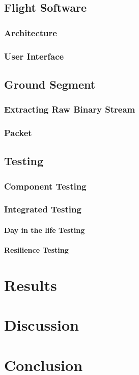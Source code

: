\section{Flight Software}

\subsection{Architecture}

\subsection{User Interface}

\section{Ground Segment}

\subsection{Extracting Raw Binary Stream}

\subsection{Packet}

\section{Testing}

\subsection{Component Testing}

\subsection{Integrated Testing}

\subsubsection{Day in the life Testing}

\subsubsection{Resilience Testing}

\newpage
\chapter{Results}
\label{ch:results}

\newpage
\chapter{Discussion}
\label{ch:discussion}

\newpage
\chapter{Conclusion}
\label{ch:conclusion}


\newpage
\printbibliography[heading=bibnumbered]  

